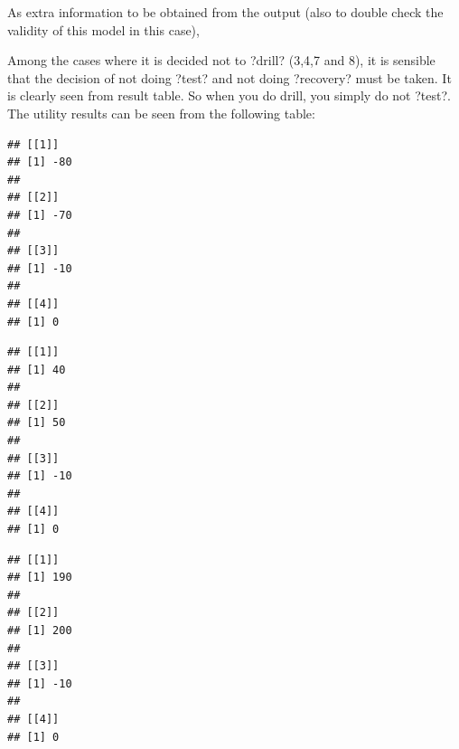 \documentclass[
]{article}
\newenvironment{Shaded}{\begin{snugshade}}{\end{snugshade}}
\newcommand{\ControlFlowTok}[1]{\textcolor[rgb]{0.13,0.29,0.53}{\textbf{#1}}}
\newcommand{\FunctionTok}[1]{\textcolor[rgb]{0.00,0.00,0.00}{#1}}
\newcommand{\NormalTok}[1]{#1}
\newcommand{\SpecialCharTok}[1]{\textcolor[rgb]{0.00,0.00,0.00}{#1}}
\newcommand{\StringTok}[1]{\textcolor[rgb]{0.31,0.60,0.02}{#1}}
\begin{document}
As extra information to be obtained from the output (also to double check the validity of this model in this case),

Among the cases where it is decided not to ?drill? (3,4,7 and 8), it is sensible that the decision of not doing ?test? and not doing ?recovery? must be taken. It is clearly seen from result table.
So when you do drill, you simply do not ?test?. The utility results can be seen from the following table:

\begin{Shaded}
\end{Shaded}

\begin{verbatim}
## [[1]]
## [1] -80
## 
## [[2]]
## [1] -70
## 
## [[3]]
## [1] -10
## 
## [[4]]
## [1] 0
\end{verbatim}

\begin{Shaded}
\end{Shaded}

\begin{verbatim}
## [[1]]
## [1] 40
## 
## [[2]]
## [1] 50
## 
## [[3]]
## [1] -10
## 
## [[4]]
## [1] 0
\end{verbatim}

\begin{Shaded}
\end{Shaded}

\begin{verbatim}
## [[1]]
## [1] 190
## 
## [[2]]
## [1] 200
## 
## [[3]]
## [1] -10
## 
## [[4]]
## [1] 0
\end{verbatim}
\end{document}
